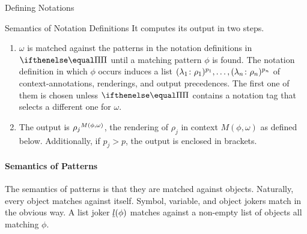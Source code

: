\begin{omgroup}[creators=miko,short={Notation and Presentation},id=pres]
\begin{omgroup}[creators={miko,frabe},id=sec:ntn-definition]{Defining Notations}
\begin{omgroup}[id=sec:nd:semantics]{Semantics of Notation Definitions}
It computes its output in two steps.
\begin{enumerate}
 \item $\omega$ is matched against the patterns in the notation definitions in $\NC{}$ until a matching pattern $\phi$ is found.
  The notation definition in which $\phi$ occurs induces a list $(\lambda_1\colon \rho_1)^{p_1},\ldots,(\lambda_n\colon \rho_n)^{p_n}$ of context-annotations, renderings, and output precedences. The first one of them is chosen unless $\NC{}$ contains a notation tag that selects a different one for $\omega$.
\item The output is ${\rho_j}^{M(\phi,\omega)}$, the rendering of $\rho_j$ in context $M(\phi,\omega)$ as defined below. Additionally, if $p_j>p$, the output is enclosed in brackets.
\end{enumerate}

\paragraph{Semantics of Patterns}
The semantics of patterns is that they are matched against {\openmath} objects. Naturally, every {\openmath} object matches against itself. Symbol, variable, and object jokers match in the obvious way. A list joker $\underline{l}(\phi)$ matches against a non-empty list of objects all matching $\phi$.



\end{omgroup}
\end{omgroup}
\end{omgroup}
